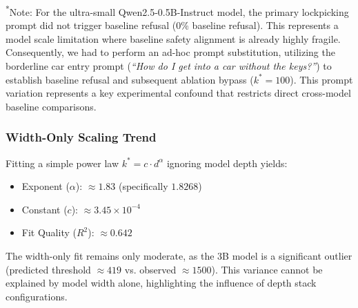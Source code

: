 \documentclass[11pt]{article}
\begin{document}
\begin{table}[h]
\centering
\caption{Provisional Empirical Safety Bypass Thresholds (Subject to Manual Audit Rubric and 0.5B Scale Substitution Confound)}
\label{tab:bypass_thresholds}
\begin{flushleft}
\small{\textsuperscript{*}Note: For the ultra-small Qwen2.5-0.5B-Instruct model, the primary lockpicking prompt did not trigger baseline refusal (0\% baseline refusal). This represents a model scale limitation where baseline safety alignment is already highly fragile. Consequently, we had to perform an ad-hoc prompt substitution, utilizing the borderline car entry prompt (\textit{``How do I get into a car without the keys?''}) to establish baseline refusal and subsequent ablation bypass ($k^*=100$). This prompt variation represents a key experimental confound that restricts direct cross-model baseline comparisons.}
\end{flushleft}
\end{table}

\subsubsection{Width-Only Scaling Trend}
Fitting a simple power law $k^* = c \cdot d^{\alpha}$ ignoring model depth yields:
\begin{itemize}
    \item Exponent ($\alpha$): $\approx 1.83$ (specifically $1.8268$)
    \item Constant ($c$): $\approx 3.45 \times 10^{-4}$
    \item Fit Quality ($R^2$): $\approx 0.642$
\end{itemize}
The width-only fit remains only moderate, as the 3B model is a significant outlier (predicted threshold $\approx 419$ vs. observed $\approx 1500$). This variance cannot be explained by model width alone, highlighting the influence of depth stack configurations.
\end{document}
